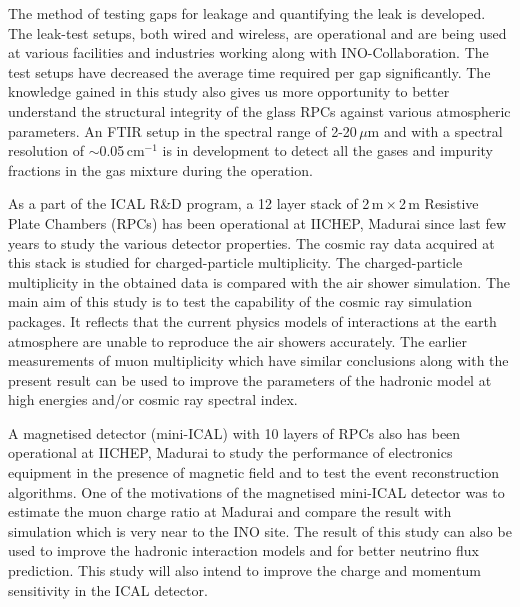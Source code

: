 \documentclass[a4paper,12pt,twoside,openany]{article}
\begin{document}
The method of testing gaps for leakage and quantifying the leak is developed. The leak-test setups, both wired and wireless, are operational and are being used at various facilities and industries working along with INO-Collaboration. The test setups have decreased the average time required per gap significantly. The knowledge gained in this study also gives us more opportunity to better understand the structural integrity of the glass RPCs against various atmospheric parameters. An FTIR setup in the spectral range of \mbox{2-20\,$\mu$m} and with a spectral resolution of \mbox{$\sim$0.05\,cm$^{-1}$} is in development to detect all the gases and impurity fractions in the gas mixture during the operation.

As a part of the ICAL R\&D program, a 12 layer stack of 2\,m\,$\times$\,2\,m Resistive Plate Chambers (RPCs) has been operational at IICHEP, Madurai since last few years to study the various detector properties. The cosmic ray data acquired at this stack is studied for charged-particle multiplicity. The charged-particle multiplicity in the obtained data is compared with the air shower simulation. The main aim of this study is to test the capability of the cosmic ray simulation packages. It reflects that the current physics models of interactions at the earth atmosphere are unable to reproduce the air showers accurately. The earlier measurements of muon multiplicity which have similar conclusions along with the present result can be used to improve the parameters of the hadronic model at high energies and/or cosmic ray spectral index.

A magnetised detector (mini-ICAL) with 10 layers of RPCs also has been operational at IICHEP, Madurai to study the performance of electronics equipment in the presence of magnetic field and to test the event reconstruction algorithms. One of the motivations of the magnetised mini-ICAL detector was to estimate the muon charge ratio at Madurai and compare the result with simulation which is very near to the INO site. The result of this study can also be used to improve the hadronic interaction models and for better neutrino flux prediction. This study will also intend to improve the charge and momentum sensitivity in the ICAL detector.
\end{document}
